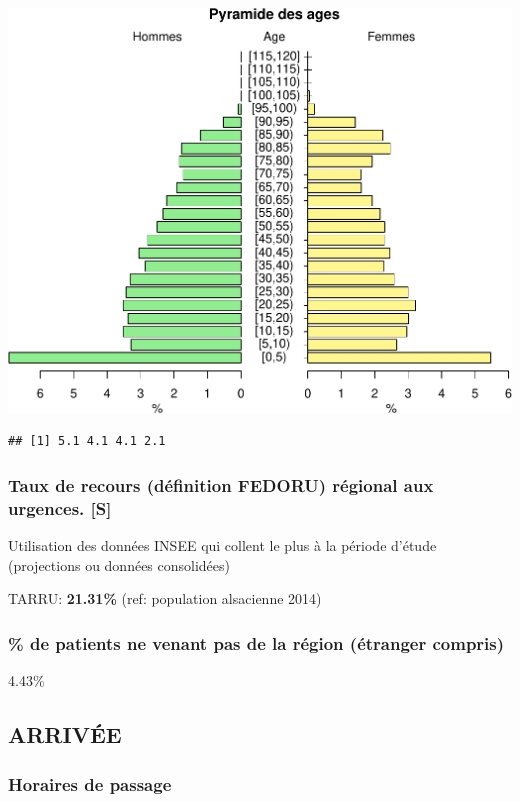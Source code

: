 \documentclass[]{article}
\begin{document}
\includegraphics{rapport2014_V4_files/figure-latex/pyramide-1.pdf}

\begin{verbatim}
## [1] 5.1 4.1 4.1 2.1
\end{verbatim}

\subsubsection{Taux de recours (définition FEDORU) régional aux
urgences.
{[}S{]}}\label{taux-de-recours-definition-fedoru-regional-aux-urgences.-s}

Utilisation des données INSEE qui collent le plus à la période d'étude
(projections ou données consolidées)

TARRU: \textbf{21.31\%} (ref: population alsacienne 2014)

\subsubsection{\% de patients ne venant pas de la région (étranger
compris)}\label{de-patients-ne-venant-pas-de-la-region-etranger-compris}

4.43\%

\subsection{ARRIVÉE}\label{arrivee}

\subsubsection{Horaires de passage}\label{horaires-de-passage}
\end{document}
